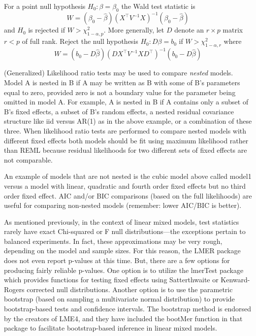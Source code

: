 \documentclass[
]{book}
\begin{document}
For a point null hypothesis \(H_0: \beta = \beta_{0}\) the Wald test statistic is
\[W = (\beta_0 - \hat\beta)(X^\top V^{-1}X)^{-1}(\beta_0 - \hat\beta)\]
and \(H_0\) is rejected if \(W > \chi^2_{1-\alpha, p}\). More generally, let \(D\) denote an \(r\times p\) matrix \(r<p\) of full rank. Reject the null hypothesis \(H_0:D\beta = b_0\) if \(W > \chi^2_{1-\alpha, r}\) where
\[W = (b_0 - D\hat\beta)(D X^\top V^{-1}X D^\top)^{-1}(b_0 - D\hat\beta)\]

(Generalized) Likelihood ratio tests may be used to compare \emph{nested} models. Model A is nested in B if A may be written as B with some of B's parameters equal to zero, provided zero is not a boundary value for the parameter being omitted in model A. For example, A is nested in B if A contains only a subset of B's fixed effects, a subset of B's random effects, a nested residual covariance structure like iid versus AR(1) as in the above example, or a combination of these three. When likelihood ratio tests are performed to compare nested models with different fixed effects both models should be fit using maximum likelihood rather than REML because residual likelihoods for two different sets of fixed effects are not comparable.

An example of models that are not nested is the cubic model above called model1 versus a model with linear, quadratic and fourth order fixed effects but no third order fixed effect. AIC and/or BIC comparisons (based on the full likelihoods) are useful for comparing non-nested models (remember: lower AIC/BIC is better).

As mentioned previously, in the context of linear mixed models, test statistics rarely have exact Chi-squared or F null distributions---the exceptions pertain to balanced experiments. In fact, these approximations may be very rough, depending on the model and sample sizes. For this reason, the LMER package does not even report p-values at this time. But, there are a few options for producing fairly reliable p-values. One option is to utilize the lmerTest package which provides functions for testing fixed effects using Satterthwaite or Kenward-Rogers corrected null distributions. Another option is to use the parametric bootstrap (based on sampling a multivariate normal distribution) to provide bootstrap-based tests and confidence intervals. The bootstrap method is endorsed by the creators of LME4, and they have included the bootMer function in that package to facilitate bootstrap-based inference in linear mixed models.
\end{document}
